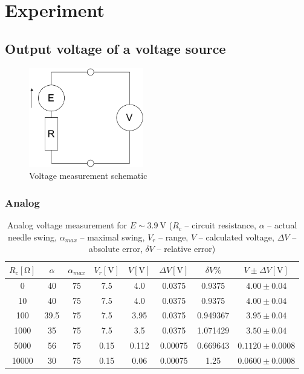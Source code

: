 \section{Experiment}

\subsection{Output voltage of a voltage source}

\begin{figure}[H]
	\centering
	\includegraphics[width=5cm]{schematics/analog_voltage.pdf}
	\caption{Voltage measurement schematic}
	\label{fig:voltage_schematics}
\end{figure}

\subsubsection*{Analog}

\begin{table}[H]
	\centering
	\begin{tabular}{ c | c | c | c | c | c | c | c}
		$R_c [\unit{\ohm}]$ & $\alpha$ & $\alpha_{max}$  & $V_r [\unit{\volt}]$ & $V [\unit{\volt}]$ & $\Delta V [\unit{\volt}]$ & $\delta V  \unit{\percent}$ & $V \pm \Delta V [\unit{\volt}]$\\
		\hline
		0 & 40 & 75 & 7.5 & 4.0 & 0.0375 & 0.9375 & $4.00 \pm 0.04$\\
		\hline
		10 & 40 & 75 & 7.5 & 4.0 & 0.0375 & 0.9375 & $4.00 \pm 0.04$\\
		\hline
		100 & 39.5 & 75 & 7.5 & 3.95 & 0.0375 & 0.949367 & $3.95 \pm 0.04$\\
		\hline
		1000 & 35 & 75 & 7.5 & 3.5 & 0.0375 & 1.071429 & $3.50 \pm 0.04$\\
		\hline
		5000 & 56 & 75 & 0.15 & 0.112 & 0.00075 & 0.669643 & $0.1120 \pm 0.0008$\\
		\hline
		10000 & 30 & 75 & 0.15 & 0.06 & 0.00075 & 1.25 & $0.0600 \pm 0.0008$
	\end{tabular}
	\caption{Analog voltage measurement for $E \sim \SI{3.9}{\volt}$ ($R_c$ -- circuit resistance, $\alpha$ -- actual needle swing, $\alpha_{max}$ -- maximal swing, $V_r$ -- range, $V$ -- calculated voltage, $\Delta V$ -- absolute error, $\delta V$ -- relative error)}
	\label{tab:analog_volt_1}
\end{table}

